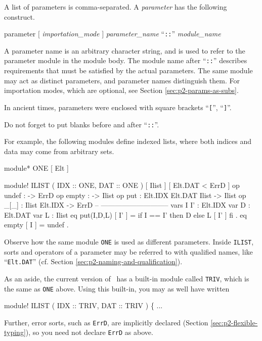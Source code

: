 \documentclass[a4paper]{memoir}
\begin{document}
A list of parameters is comma-separated. A {\em parameter}
has the following construct.

\begin{bsyntax} parameter \Hline
$[$ \textit{importation\_mode} $]$ \textit{parameter\_name} ``\texttt{::}'' \textit{module\_name}
\end{bsyntax}

A parameter name is an arbitrary character string, and is used to
refer to the parameter module in the module body. The module name
after ``\verb|::|'' describes requirements that must be satisfied by
the actual parameters. The same module may act as distinct parameters,
and parameter names distinguish them.
For importation modes, which are optional, see
Section \ref{sec:p2-params-as-subs}.

\begin{warning}
  In ancient times, parameters were enclosed with square brackets ``\verb|[|'',
  ``\verb|]|''.
\end{warning}

\begin{warning}
  Do not forget to put blanks before and after ``\verb|::|''.
\end{warning}

For example, the following modules define indexed lists,
where both indices and data may come from arbitrary sets.
\label{exs:ilist}
\begin{vvtm}
\begin{ccode}
   module* ONE { [ Elt ] }

   module! ILIST ( IDX :: ONE, DAT :: ONE ) {
     [ Ilist ]
     [ Elt.DAT < ErrD ]
     op undef : -> ErrD
     op empty : -> Ilist
     op put : Elt.IDX Elt.DAT Ilist -> Ilist
     op _[_] : Ilist Elt.IDX -> ErrD
     -- -----------------------------
     vars I I' : Elt.IDX
     var D : Elt.DAT
     var L : Ilist
     eq put(I,D,L) [ I' ] = if I == I' then D else L [ I' ] fi .
     eq empty [ I ] = undef .
   }
\end{ccode}
\end{vvtm}
Observe how the same module \verb|ONE| is used as different parameters.
Inside \verb|ILIST|, sorts and operators of a parameter may be
referred to with qualified names, like ``\verb|Elt.DAT|''
(cf. Section \ref{sec:p2-naming-and-qualification}).

As an aside, the current version of \cafeobj~has a built-in module
called \verb|TRIV|, which is the same as \verb|ONE| above.\label{exs:triv}
Using this built-in, you may as well have written
\begin{vvtm}
\begin{ccode}
   module! ILIST ( IDX :: TRIV, DAT :: TRIV ) \{ ...
\end{ccode}
\end{vvtm}
Further, error sorts, such as \verb|ErrD|, are implicitly declared
(Section \ref{sec:p2-flexible-typing}), so you need not declare
\verb|ErrD| as above.
\end{document}
